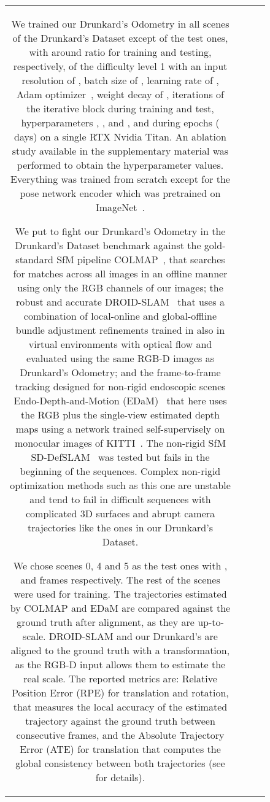 \documentclass{article}
\newcommand{\boldparagraph}[1]{\vspace{0.0em}\noindent{\bf #1}}
\begin{document}
\begin{figure}
\begin{tabular}{cccc}
\boldparagraph{Drunkard's Setup.}
We trained our Drunkard's Odometry in all scenes of the Drunkard's Dataset except of the test ones, with around  ratio for training and testing, respectively, of the difficulty level 1 with an input resolution of , batch size of , learning rate of , Adam optimizer~\cite{loshchilov2017decoupled}, weight decay of ,  iterations of the iterative block during training and test, hyperparameters , ,  and , and during  epochs ( days) on a single RTX Nvidia Titan. An ablation study available in the supplementary material was performed to obtain the hyperparameter values. Everything was trained from scratch except for the pose network encoder which was pretrained on ImageNet~\cite{deng2009imagenet}. 


\boldparagraph{Drunkard's Benchmark.}
We put to fight our Drunkard's Odometry in the Drunkard's Dataset benchmark against the gold-standard SfM pipeline COLMAP~\cite{schoenberger2016sfm, schoenberger2016mvs}, that searches for matches across all images in an offline manner using only the RGB channels of our images; the robust and accurate DROID-SLAM~\cite{teed2021droid} that uses a combination of local-online and global-offline bundle adjustment refinements trained in also in virtual environments with optical flow and evaluated using the same RGB-D images as Drunkard's Odometry; and the frame-to-frame tracking designed for non-rigid endoscopic scenes Endo-Depth-and-Motion (EDaM)~\cite{recasens2021endo} that here uses the RGB plus the single-view estimated depth maps using a network trained self-supervisely on monocular images of KITTI~\cite{geiger2013vision}. The non-rigid SfM SD-DefSLAM~\cite{gomez2021sd} was tested but fails in the beginning of the sequences. Complex non-rigid optimization methods such as this one are unstable and tend to fail in difficult sequences with complicated 3D surfaces and abrupt camera trajectories like the ones in our Drunkard's Dataset.

We chose scenes 0, 4 and 5 as the test ones with ,  and  frames respectively. The rest of the scenes were used for training. The trajectories estimated by COLMAP and EDaM are compared against the ground truth after  alignment, as they are up-to-scale. DROID-SLAM and our Drunkard's are aligned to the ground truth with a  transformation, as the RGB-D input allows them to estimate the real scale. The reported metrics are: Relative Position Error (RPE) for translation and rotation, that measures the local accuracy of the estimated trajectory against the ground truth between consecutive frames, and the Absolute Trajectory Error (ATE) for translation that computes the global consistency between both trajectories (see \cite{prokhorov2019measuring} for details).


\end{tabular}
\end{figure}
\end{document}
